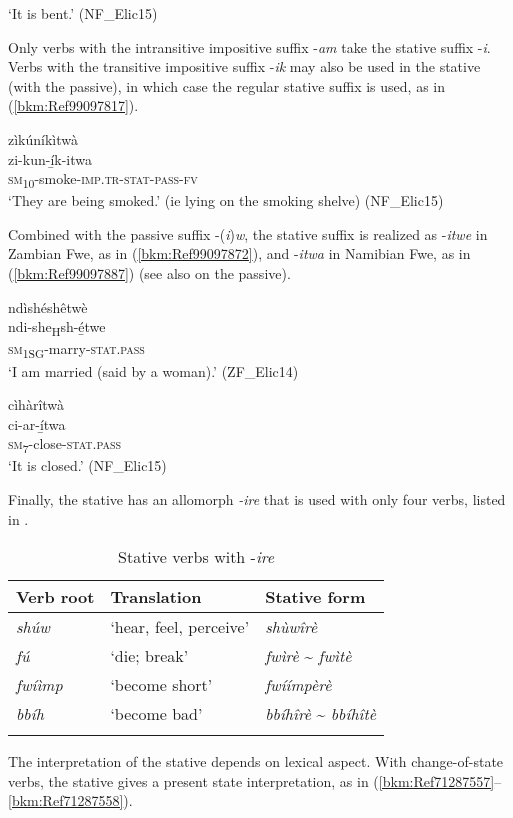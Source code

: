 \glt ‘It is bent.’ (NF\_Elic15)\label{bkm:Ref431911100}
\z\z

Only verbs with the intransitive impositive suffix -\textit{am} take the stative suffix -\textit{i}. Verbs with the transitive impositive suffix -\textit{ik} may also be used in the stative (with the passive), in which case the regular stative suffix is used, as in (\ref{bkm:Ref99097817}).

\ea
\label{bkm:Ref99097817}
\glll zìkúníkìtwà\\
zi-kun-í̲k-itwa\\
\textsc{sm}\textsubscript{10}-smoke-\textsc{imp}.\textsc{tr}-\textsc{stat}-\textsc{pass}-\textsc{fv}\\
\glt ‘They are being smoked.’ (ie lying on the smoking shelve) (NF\_Elic15)
\z

Combined with the passive suffix -(\textit{i})\textit{w}, the stative suffix is realized as -\textit{itwe} in Zambian Fwe, as in (\ref{bkm:Ref99097872}), and -\textit{itwa} in Namibian Fwe, as in (\ref{bkm:Ref99097887}) (see also  on the passive).

\ea
\label{bkm:Ref99097872}
\glll ndìshéshêtwè\\
ndi-she\textsubscript{H}sh-é̲twe\\
\textsc{sm}\textsubscript{1SG}-marry-\textsc{stat}.\textsc{pass}\\
\glt ‘I am married (said by a woman).’ (ZF\_Elic14)
\z

\ea
\label{bkm:Ref99097887}
\glll cìhàrîtwà\\
ci-ar-í̲twa\\
\textsc{sm}\textsubscript{7}-close-\textsc{stat}.\textsc{pass}\\
\glt ‘It is closed.’ (NF\_Elic15)
\z

Finally, the stative has an allomorph \textit{-ire} that is used with only four verbs, listed in .

\begin{table}
\label{bkm:Ref506287274}\caption{\label{tab:9:6}Stative verbs with -\textit{ire}}

\begin{tabular}{lll}
\lsptoprule
Verb root & Translation & Stative form\\
\midrule
\textit{shúw} & ‘hear, feel, perceive’ & \textit{shùwîrè}\\
\textit{fú} & ‘die; break’ & \textit{fwìrè} {\textasciitilde} \textit{fwìtè}\\
\textit{fwíìmp} & ‘become short’ & \textit{fwíímpèrè}\\
\textit{bbíh} & ‘become bad’ & \textit{bbíhîrè} {\textasciitilde} \textit{bbíhîtè}\\
\lspbottomrule
\end{tabular}
\end{table}
The interpretation of the stative depends on lexical aspect. With change-of-state verbs, the stative gives a present state interpretation, as in (\ref{bkm:Ref71287557}--\ref{bkm:Ref71287558}).

